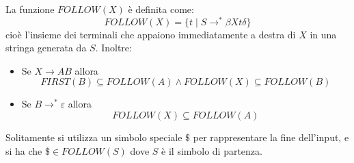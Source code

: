 \documentclass[a4paper]{article}
\begin{document}
\vspace{1em}
\noindent
\begin{definition}
  La funzione \( FOLLOW(X) \) è definita come:
  \[
    FOLLOW(X) = \{ t \mid S \to^* \beta X t \delta \}
  \] 
  cioè l'insieme dei terminali che appaiono immediatamente a destra di \( X \) in una
  stringa generata da \( S \). Inoltre:
  \begin{itemize}
    \item Se \( X \to AB \) allora
      \[
        FIRST(B) \subseteq FOLLOW(A) \land FOLLOW(X) \subseteq FOLLOW(B)
      \] 

    \item Se \( B \to^* \varepsilon \) allora
      \[
        FOLLOW(X) \subseteq FOLLOW(A)
      \] 
  \end{itemize}
  Solitamente si utilizza un simbolo speciale \( \$ \) per rappresentare la fine
  dell'input, e si ha che \( \$ \in FOLLOW(S) \) dove \( S \) è il simbolo di partenza.
\end{definition}
\end{document}
